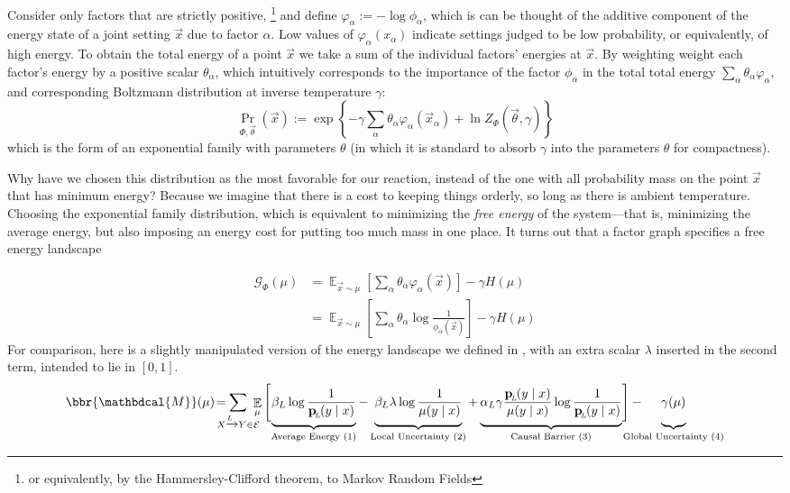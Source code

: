 \documentclass{article}
\theoremstyle{plain}
\theoremstyle{definition}
\theoremstyle{remark}
\let\H\relax
\DeclareMathOperator{\H}{\mathrm{H}} %
\DeclareMathOperator*{\E}{\mathbb{E}} %
\newcommand\mat[1]{\mathbf{#1}}
\newcommand{\bp}[1][L]{\mat{p}_{\!_{#1}\!}}
\newcommand{\Ed}{\mathcal E}
\newcommand{\dg}[1]{\mathbdcal{#1}}
\numberwithin{equation}{section}
\begin{document}
Consider only factors that are strictly positive,%
	\footnote{or equivalently, by the Hammersley-Clifford theorem, to Markov Random Fields}
and define $ \varphi_\alpha := -\log \phi_\alpha$, which is can be thought of the additive component of the energy state of a joint setting $\vec x$ due to factor $\alpha$. 
Low values of $\varphi_\alpha(x_\alpha)$ indicate settings judged to be low probability, or equivalently, of high energy. 
To obtain the total energy of a point $\vec x$ we take a sum of the individual factors' energies at $\vec x$. By weighting weight each factor's energy by a positive scalar $\theta_\alpha$, which intuitively corresponds to the importance of the factor $\phi_\alpha$ in the total total energy $\sum_\alpha \theta_\alpha \varphi_\alpha$,
and corresponding Boltzmann distribution at inverse temperature $\gamma$:
\[ \Pr_{\Phi, \vec\theta} (\vec x)  := \exp \left\{ -\gamma \sum_\alpha \theta_\alpha \varphi_\alpha(\vec x_\alpha)  + \ln Z_\Phi(\vec \theta, \gamma) \right\} \] 
which is the form of an exponential family with parameters $\theta$ (in which it is standard to absorb $\gamma$ into the parameters $\theta$ for compactness).

Why have we chosen this distribution as the most favorable for our reaction, instead of the one with all probability mass on the point $\vec x$ that has minimum energy? Because we imagine that there is a cost to keeping things orderly, so long as there is ambient temperature. Choosing the exponential family distribution, which is equivalent to minimizing the \emph{free energy} of the system---that is, minimizing the average energy, but also imposing an energy cost for putting too much mass in one place. It turns out that a factor graph specifies a free energy landscape

\begin{align*}
	\mathcal G_\Phi(\mu) &=  \E_{\vec x \sim \mu} \left[\sum_\alpha \theta_\alpha \varphi_\alpha(\vec x) \right] - \gamma H(\mu) \\
		&= \E_{\vec x \sim \mu} \left[\sum_\alpha \theta_\alpha \log \frac{1}{\phi_\alpha(\vec x)} \right] - \gamma H(\mu)
\end{align*}
For comparison, here is a slightly manipulated version of the energy landscape we defined in , with an extra scalar $\lambda$ inserted in the second term, intended to lie in $[0,1]$.
\begin{equation*}
	\bbr{\dg M}(\mu) \!=\mskip-18mu \sum_{ X \xrightarrow{\!\!L} Y  \in \Ed } \!\!\!\!\E_\mu  \Bigg[\!
		\underbrace{\beta_L \log \frac{1}{\bp(y\mid x)} \vphantom{\Bigg|}}_{\text{Average Energy (1)}}  - 
		\underbrace{\beta_L \lambda \log \frac{1}{\mu(y \mid x)}  \vphantom{\Bigg|}}_{\text{Local Uncertainty (2)}}  + 
		\underbrace{\alpha_L \gamma \frac{\bp(y \mid x)}{\mu(y \mid x)}\log \frac{1}{\bp(y\mid x)}  \vphantom{\Bigg|}}_{\text{Causal Barrier (3)}}\! \Bigg] - 
		\mskip-31mu\underbrace{\gamma \H(\mu) \vphantom{\Bigg|} }_{\text{Global Uncertainty (4)}}
\end{equation*}
\end{document}

